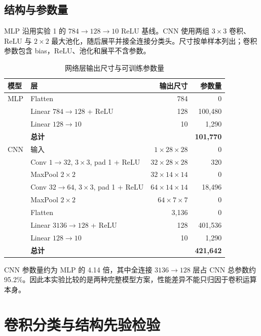 \documentclass[dvipsnames,svgnames,a4paper,10pt]{article}
\begin{document}
\subsection{结构与参数量}
MLP 沿用实验 1 的 $784\to128\to10$ ReLU 基线。CNN 使用两组 $3\times3$ 卷积、ReLU 与 $2\times2$ 最大池化，随后展平并接全连接分类头。尺寸按单样本列出；卷积参数包含 bias，ReLU、池化和展平不含参数。
\begin{table}[H]
\centering\small
\caption{网络层输出尺寸与可训练参数量}
\begin{tabular}{llrr}
\toprule
模型 & 层 & 输出尺寸 & 参数量 \\
\midrule
MLP & Flatten & 784 & 0 \\
 & Linear $784\to128$ + ReLU & 128 & 100,480 \\
 & Linear $128\to10$ & 10 & 1,290 \\
 & \textbf{总计} & & \textbf{101,770} \\
\midrule
CNN & 输入 & $1\times28\times28$ & 0 \\
 & Conv $1\to32$, $3\times3$, pad 1 + ReLU & $32\times28\times28$ & 320 \\
 & MaxPool $2\times2$ & $32\times14\times14$ & 0 \\
 & Conv $32\to64$, $3\times3$, pad 1 + ReLU & $64\times14\times14$ & 18,496 \\
 & MaxPool $2\times2$ & $64\times7\times7$ & 0 \\
 & Flatten & 3,136 & 0 \\
 & Linear $3136\to128$ + ReLU & 128 & 401,536 \\
 & Linear $128\to10$ & 10 & 1,290 \\
 & \textbf{总计} & & \textbf{421,642} \\
\bottomrule
\end{tabular}
\end{table}
CNN 参数量约为 MLP 的 4.14 倍，其中全连接 $3136\to128$ 层占 CNN 总参数约 95.2\%。因此本实验比较的是两种完整模型方案，性能差异不能只归因于卷积运算本身。

\section{卷积分类与结构先验检验}
\end{document}
